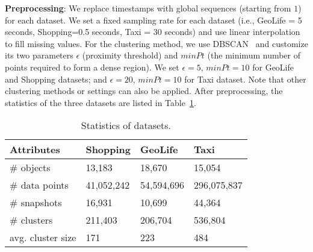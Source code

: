 \textbf{Preprocessing}: We replace timestamps with global sequences (starting from $1$) for each dataset. 
We set a fixed sampling rate for each dataset (i.e., GeoLife = 5 seconds, Shopping=0.5 seconds, Taxi = 30 seconds)
and use linear interpolation to fill missing values.
For the clustering method, we use DBSCAN~\cite{ester1996density} and customize its two parameters $\epsilon$ (proximity threshold) and $minPt$ (the minimum number of points required to form a dense region). We set $\epsilon=5$, $minPt=10$ for GeoLife and Shopping datasets; and $\epsilon=20$, $minPt=10$ for Taxi dataset. Note that other clustering methods or settings can also be applied. 
After preprocessing, the statistics of the three datasets are listed in Table~\ref{exp:dataset}. 

\begin{table} [h]
\center
\begin{tabular}{|l|l|l|l|}
\hline
 \textbf{Attributes}& \textbf{Shopping} &  \textbf{GeoLife} &  \textbf{Taxi} \\ 
\hline 
\# objects  & 13,183 & 18,670 & 15,054\\ 
\hline
\# data points  & 41,052,242 & 54,594,696 & 296,075,837\\ 
\hline
\# snapshots  & 16,931 & 10,699 & 44,364\\ 
\hline
\# clusters  & 211,403  & 206,704& 536,804\\
\hline
avg. cluster size  & 171 & 223 & 484\\
\hline
\end{tabular}
 \vspace{-0.5em}
\caption{Statistics of datasets.}
\vspace{-0.5em}
\label{exp:dataset}
\end{table}

